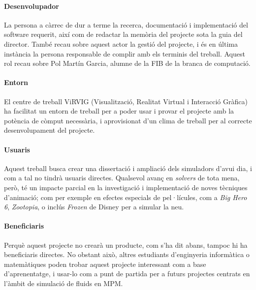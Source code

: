 \documentclass[a4paper]{report}
\begin{document}
	\paragraph{Desenvolupador} La persona a càrrec de dur a terme la recerca, documentació i implementació del software requerit, així com de redactar la memòria del projecte sota la guia del director. També recau sobre aquest actor la gestió del projecte, i és en última instància la persona responsable de complir amb els terminis del treball. Aquest rol recau sobre Pol Martín Garcia, alumne de la FIB de la branca de computació.
	\paragraph{Entorn} El centre de treball ViRVIG (Visualització, Realitat Virtual i Interacció Gràfica) ha facilitat un entorn de treball per a poder usar i provar el projecte amb la potència de còmput necessària, i aprovisionat d'un clima de treball per al correcte desenvolupament del projecte.
	\paragraph{Usuaris} Aquest treball busca crear una dissertació i ampliació dels simuladors d'avui dia, i com a tal no tindrà usuaris directes. Qualsevol avanç en \textit{solvers} de tota mena, però, té un impacte parcial en la investigació i implementació de noves tècniques d'animació; com per exemple en efectes especials de pel·lícules, com a \textit{Big Hero 6}, \textit{Zootopia}, o inclús \textit{Frozen} de Disney \cite{Stomakhin} per a simular la neu.
	\paragraph{Beneficiaris} Perquè aquest projecte no crearà un producte, com s'ha dit abans, tampoc hi ha beneficiaris directes. No obstant això, altres estudiants d'enginyeria informàtica o matemàtiques poden trobar aquest projecte interessant com a base d'aprenentatge, i usar-lo com a punt de partida per a futurs projectes centrats en l'àmbit de simulació de fluids en MPM.
	
\end{document}
